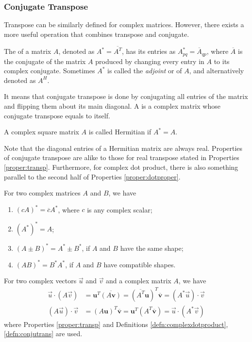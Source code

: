 \subsubsection{Conjugate Transpose}
Transpose can be similarly defined for complex matrices. However, there exists a more useful operation that combines transpose and conjugate.
\begin{defn}
\label{defn:conjutrans}
The  of a matrix $A$, denoted as $A^* = \overline{A^T}$, has its entries as $A^*_{pq} = \overline{A}_{qp}$, where $\overline{A}$ is the conjugate of the matrix $A$ produced by changing every entry in $A$ to its complex conjugate. Sometimes $A^*$ is called the \textit{adjoint} or  of $A$, and alternatively denoted as $A^H$. 
\end{defn}
It means that conjugate transpose is done by conjugating all entries of the matrix and flipping them about its main diagonal. A  is a complex matrix whose conjugate transpose equals to itself.
\begin{defn}
\label{defn:Hermitian}
A complex square matrix $A$ is called Hermitian if $A^* = A$.
\end{defn}
Note that the diagonal entries of a Hermitian matrix are always real. Properties of conjugate transpose are alike to those for real transpose stated in Properties \ref{proper:transp}. Furthermore, for complex dot product, there is also something parallel to the second half of Properties \ref{proper:dotproper}.
\begin{proper}
\label{proper:complexmat}
For two complex matrices $A$ and $B$, we have
\begin{enumerate}
\item $(cA)^* = \overline{c}A^*$, where $c$ is any complex scalar;
\item $(A^*)^* = A$;
\item $(A \pm B)^* = A^* \pm B^*$, if $A$ and $B$ have the same shape;
\item $(AB)^* = B^*A^*$, if $A$ and $B$ have compatible shapes.
\end{enumerate}
\end{proper}
\begin{proper}
\label{proper:complexdotherm}
For two complex vectors $\vec{u}$ and $\vec{v}$ and a complex matrix $A$, we have 
\begin{align*}
\vec{u} \cdot (A\vec{v}) &= \textbf{u}^T\overline{(A\textbf{v})} = (\overline{A^T}\textbf{u})^T\overline{\textbf{v}} = (A^*\vec{u}) \cdot \vec{v} \\
(A\vec{u}) \cdot \vec{v} &= (A\textbf{u})^T\overline{\textbf{v}} = \textbf{u}^T(A^T\overline{\textbf{v}}) = \vec{u} \cdot (A^*\vec{v})
\end{align*}
where Properties \ref{proper:transp} and Definitions \ref{defn:complexdotproduct}, \ref{defn:conjutrans} are used.
\end{proper}

